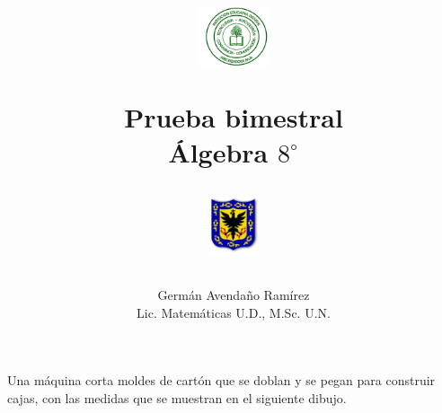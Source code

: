 \documentclass[10pt,letterpaper,addpoints]{exam}
\begin{document}
\title{\begin{minipage}{.2\textwidth}
        \includegraphics[height=1.75cm]{Images/logo-colegio.png}
       \end{minipage}
\begin{minipage}{.55\textwidth}
 \begin{center}
Prueba bimestral \\Álgebra $8^{\circ}$
\end{center}
\end{minipage}
\begin{minipage}{.2\textwidth}
\includegraphics[height=1.75cm]{Images/logo-sed.png} 
\end{minipage}
}
\author{Germ\'{a}n Avendaño Ram\'{i}rez\\Lic. Matemáticas U.D., M.Sc. U.N.}
\date{}
\maketitle
\begin{center}
\end{center}
\vspace{0.1in}
\begin{questions}
\question
\begin{minipage}{.65\textwidth}
Una máquina corta moldes de cartón que se doblan y se pegan para construir cajas, con las medidas que se muestran en el siguiente dibujo.
\end{minipage}\hfill
\begin{minipage}{.35\textwidth}
\end{minipage}

\end{questions}
\end{document}
